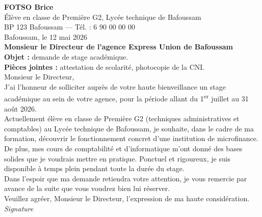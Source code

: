 \documentclass[11pt]{article}
\begin{document}
\begin{exemplebox}
\textbf{FOTSO Brice}\\
Élève en classe de Première G2, Lycée technique de Bafoussam\\
BP 123 Bafoussam --- Tél. : 6 90 00 00 00\\[4pt]
\hfill Bafoussam, le 12 mai 2026\\[4pt]
\hfill \textbf{Monsieur le Directeur de l'agence Express Union de Bafoussam}\\[4pt]
\textbf{Objet :} demande de stage académique.\\
\textbf{Pièces jointes :} attestation de scolarité, photocopie de la CNI.\\[4pt]
Monsieur le Directeur,\\[4pt]
\hspace{0.6cm} J'ai l'honneur de solliciter auprès de votre haute bienveillance un stage académique au sein de votre agence, pour la période allant du 1\textsuperscript{er} juillet au 31 août 2026.\\[4pt]
\hspace{0.6cm} Actuellement élève en classe de Première G2 (techniques administratives et comptables) au Lycée technique de Bafoussam, je souhaite, dans le cadre de ma formation, découvrir le fonctionnement concret d'une institution de microfinance. De plus, mes cours de comptabilité et d'informatique m'ont donné des bases solides que je voudrais mettre en pratique. Ponctuel et rigoureux, je suis disponible à temps plein pendant toute la durée du stage.\\[4pt]
\hspace{0.6cm} Dans l'espoir que ma demande retiendra votre attention, je vous remercie par avance de la suite que vous voudrez bien lui réserver.\\[4pt]
\hspace{0.6cm} Veuillez agréer, Monsieur le Directeur, l'expression de ma haute considération.\\[6pt]
\hfill \emph{Signature}
\end{exemplebox}
\end{document}

